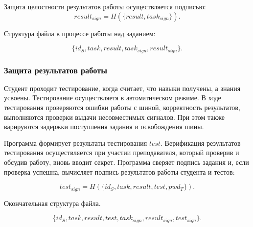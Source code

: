 Защита целостности результатов работы осуществляется подписью:
\[result_{sign} = H(\{result, task_{sign}\}).\]

Структура файла в процессе работы над заданием:

\[\{id_S, task, result, task_{sign}, result_{sign}\}.\]


\subsubsection{Защита результатов работы}

Студент проходит тестирование, когда считает, что навыки получены, а знания усвоены. Тестирование осуществляетя в автоматическом режиме. В ходе тестирования проверяются ошибки работы с шиной, корректность результатов, выполняются проверки выдачи несовместимых сигналов. При этом также варируются задержки поступления задания и освобождения шины.

Программа формирует результаты тестирования $test$. Верификация результатов тестирования осуществляется при участии преподавателя, который проверив и обсудив работу, вновь вводит секрет. Программа сверяет подпись задания и, если проверка успешна, вычисляет подпись результатов работы студента и тестов:

\[test_{sign} = H(\{id_S, task, result, test, pwd_T\}).\]

Окончательная структура файла. 

\[\{id_S, task, result, test, task_{sign}, result_{sign}, test_{sign}\}.\]
